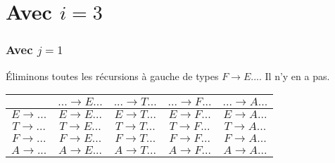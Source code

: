 \documentclass[class=article]{standalone}
\begin{document}
\section*{Avec $i = 3$}
\subsubsection*{Avec $j=1$}
Éliminons toutes les récursions à gauche de types $F \rightarrow E...$. Il n'y en a pas.
\begin{center}
    \begin{tabular}{c|c|c|c|c|}
        \cellcolor[HTML]{FFFFFF}                     & 
        \cellcolor[HTML]{FFFFFF} $... \rightarrow E...$ &
        \cellcolor[HTML]{FFFFFF} $... \rightarrow T...$ & 
        \cellcolor[HTML]{FFFFFF} $... \rightarrow F...$ & 
        \cellcolor[HTML]{FFFFFF} $... \rightarrow A...$ \\
    \hline
        \cellcolor[HTML]{FFFFFF} $E \rightarrow ...$ & 
        \cellcolor[HTML]{FF0000} $E \rightarrow E...$ & 
        \cellcolor[HTML]{ABFF00} $E \rightarrow T...$ & 
        \cellcolor[HTML]{ABFF00} $E \rightarrow F...$ & 
        \cellcolor[HTML]{ABFF00} $E \rightarrow A...$ \\
    \hline
        \cellcolor[HTML]{FFFFFF} $T \rightarrow ...$ & 
        \cellcolor[HTML]{FF0000} $T \rightarrow E...$ & 
        \cellcolor[HTML]{FF0000} $T \rightarrow T...$ & 
        \cellcolor[HTML]{ABFF00} $T \rightarrow F...$ &
        \cellcolor[HTML]{ABFF00} $T \rightarrow A...$ \\
    \hline
        \cellcolor[HTML]{FFFFFF} $F \rightarrow ...$ &
        \cellcolor[HTML]{FF0000} $F \rightarrow E...$ &
        \cellcolor[HTML]{FFFFFF} $F \rightarrow T...$ & 
        \cellcolor[HTML]{FFFFFF} $F \rightarrow F...$ & 
        \cellcolor[HTML]{ABFF00} $F \rightarrow A...$ \\
    \hline
        \cellcolor[HTML]{FFFFFF} $A \rightarrow ...$ & 
        \cellcolor[HTML]{FFFFFF} $A \rightarrow E...$ & 
        \cellcolor[HTML]{FFFFFF} $A \rightarrow T...$ & 
        \cellcolor[HTML]{FFFFFF} $A \rightarrow F...$ & 
        \cellcolor[HTML]{FFFFFF} $A \rightarrow A...$ \\
    \hline
    \end{tabular}
\end{center}
\end{document}
